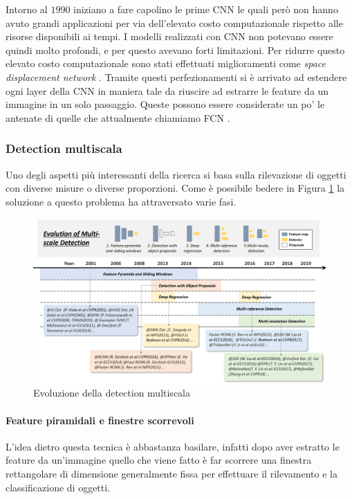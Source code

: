 Intorno al $1990$ iniziano a fare capolino le prime \ac{CNN} \cite{vaillant1994original} le quali però non hanno avuto grandi applicazioni per via dell'elevato costo computazionale rispetto alle risorse disponibili ai tempi. I modelli realizzati con \ac{CNN} non potevano essere quindi molto profondi, e per questo avevano forti limitazioni. Per ridurre questo elevato costo computazionale sono stati effettuati miglioramenti come \textit{space displacement network} \cite{lecun1998gradient}. Tramite questi perfezionamenti si è arrivato ad estendere ogni layer della \ac{CNN} in maniera tale da riuscire ad estrarre le feature da un immagine in un solo passaggio. Queste possono essere considerate un po' le antenate di quelle che attualmente chiamiamo \ac{FCN} \cite{long2015fully} \cite{chen2014semantic}. 
\subsubsection{Detection multiscala}
\label{subsec:multiscale_detection}
Uno degli aspetti più interessanti della ricerca si basa sulla rilevazione di oggetti con diverse misure o diverse proporzioni. Come è possibile bedere in Figura \ref{fig:multi_scale_history} la soluzione a questo problema ha attraversato varie fasi.
\begin{figure}
    \centering
    \includegraphics[width=\textwidth]{images/evol-multiscale.png}
    \caption{Evoluzione della detection multiscala \cite{DBLP:journals/corr/abs-1905-05055}}
    \label{fig:multi_scale_history}
\end{figure}
\paragraph{Feature piramidali e finestre scorrevoli}
L'idea dietro questa tecnica è abbastanza basilare, infatti dopo aver estratto le feature da un'immagine quello che viene fatto è far scorrere una finestra rettangolare di dimensione generalmente fissa per effettuare il rilevamento e la classificazione di oggetti. 


